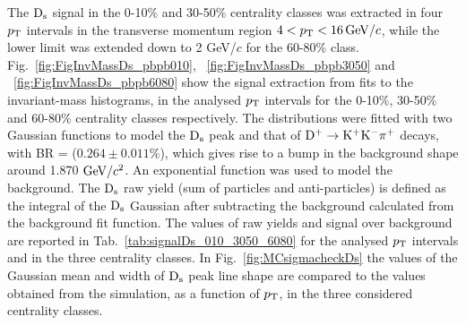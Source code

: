  The ${\rm D_s}$ signal in the 0-10$\%$ and 30-50\% centrality classes was extracted in four $p_{\rm T}$ 
 intervals in the transverse momentum region $4 < p_{\rm T} <16 \, \mathrm{GeV}/c$, while the lower limit was extended down to 2 GeV/$c$
for the 60-80\% class. Fig.~\ref{fig:FigInvMassDs_pbpb010}, ~\ref{fig:FigInvMassDs_pbpb3050} and ~\ref{fig:FigInvMassDs_pbpb6080} show the signal extraction
from fits to the invariant-mass histograms, in the analysed $p_{\rm T}$ intervals
for the 0-10\%, 30-50\% and 60-80\% centrality classes respectively.
The distributions were fitted with two Gaussian functions to model
the ${\rm D_s}$ peak and that of ${\rm D^{+}\to K^+ K^-\pi^+}$ decays, with BR = ($0.264 \pm 0.011\%$),
which gives rise to a bump in the background shape around 1.870 $\mathrm{GeV}/c^{2}$. 
An exponential function was used to model the background.
The ${\rm D_s}$ raw yield (sum of particles and anti-particles) is defined as the integral of the ${\rm D_s}$ Gaussian 
after subtracting the background calculated from the 
background fit function. 
The values of raw yields and signal over background are reported in
Tab.~\ref{tab:signalDs_010_3050_6080} for the analysed $p_{\rm T}$ intervals and in the three centrality classes.
In Fig.~\ref{fig:MCsigmacheckDs} the values of the Gaussian mean and width of ${\rm D_s}$ 
peak line shape are compared to the values obtained from the simulation, as a function of $p_{\rm T}$, in the 
three considered centrality classes.

